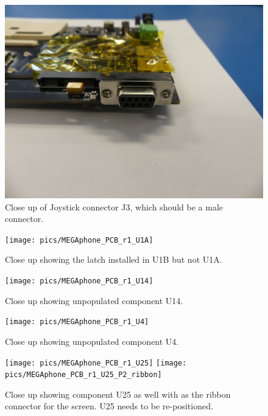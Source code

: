 \begin{figure} \begin{center}
\includegraphics[width=.3\linewidth]{pics/MEGAphone_PCB_r1_J3} 
\end{center} 
\caption{Close up of Joystick connector J3, which should be a male connector.\\}
\label{MEGAphone_PCB_r1_J3}
\end{figure}

\begin{figure} \begin{center}
\texttt{[image: pics/MEGAphone\_PCB\_r1\_U1A]} 
\end{center} 
\caption{Close up showing the latch installed in U1B but not U1A.\\}
\label{MEGAphone_PCB_r1_U1A}
\end{figure}

\begin{figure} \begin{center}
\texttt{[image: pics/MEGAphone\_PCB\_r1\_U14]} 
\end{center} 
\caption{Close up showing unpopulated component U14.\\}
\label{MEGAphone_PCB_r1_U14}
\end{figure}

\begin{figure} \begin{center}
\texttt{[image: pics/MEGAphone\_PCB\_r1\_U4]} 
\end{center} 
\caption{Close up showing unpopulated component U4.\\}
\label{MEGAphone_PCB_r1_U4}
\end{figure}

\begin{figure} \begin{center}
\texttt{[image: pics/MEGAphone\_PCB\_r1\_U25]}
\texttt{[image: pics/MEGAphone\_PCB\_r1\_U25\_P2\_ribbon]}
\end{center} 
\caption{Close up showing component U25 as well with as the ribbon connector for the screen. U25 needs to be re-positioned.\\}
\label{MEGAphone_PCB_r1_U25}
\end{figure}

